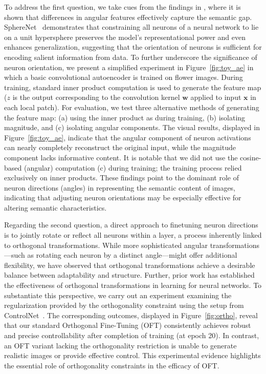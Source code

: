 To address the first question, we take cues from the findings in \cite{liu2018decoupled,chen2020angular}, where it is shown that differences in angular features effectively capture the semantic gap. SphereNet~\cite{liu2017deep} demonstrates that constraining all neurons of a neural network to lie on a unit hypersphere preserves the model’s representational power and even enhances generalization, suggesting that the orientation of neurons is sufficient for encoding salient information from data. To further underscore the significance of neuron orientation, we present a simplified experiment in Figure~\ref{fig:toy_ae} in which a basic convolutional autoencoder is trained on flower images. During training, standard inner product computation is used to generate the feature map ($z$ is the output corresponding to the convolution kernel $\bm{w}$ applied to input $\bm{x}$ in each local patch). For evaluation, we test three alternative methods of generating the feature map: (a) using the inner product as during training, (b) isolating magnitude, and (c) isolating angular components. The visual results, displayed in Figure~\ref{fig:toy_ae}, indicate that the angular component of neuron activations can nearly completely reconstruct the original input, while the magnitude component lacks informative content. It is notable that we did not use the cosine-based (angular) computation (c) during training; the training process relied exclusively on inner products. These findings point to the dominant role of neuron directions (angles) in representing the semantic content of images, indicating that adjusting neuron orientations may be especially effective for altering semantic characteristics.

Regarding the second question, a direct approach to finetuning neuron directions is to jointly rotate or reflect all neurons within a layer, a process inherently linked to orthogonal transformations. While more sophisticated angular transformations—such as rotating each neuron by a distinct angle—might offer additional flexibility, we have observed that orthogonal transformations achieve a desirable balance between adaptability and structure. Further, prior work \cite{liu2021orthogonal} has established the effectiveness of orthogonal transformations in learning for neural networks. To substantiate this perspective, we carry out an experiment examining the regularization provided by the orthogonality constraint using the setup from ControlNet~\cite{zhang2023adding}. The corresponding outcomes, displayed in Figure~\ref{fig:ortho}, reveal that our standard Orthogonal Fine-Tuning (OFT) consistently achieves robust and precise controllability after completion of training (at epoch 20). In contrast, an OFT variant lacking the orthogonality restriction is unable to generate realistic images or provide effective control. This experimental evidence highlights the essential role of orthogonality constraints in the efficacy of OFT.

